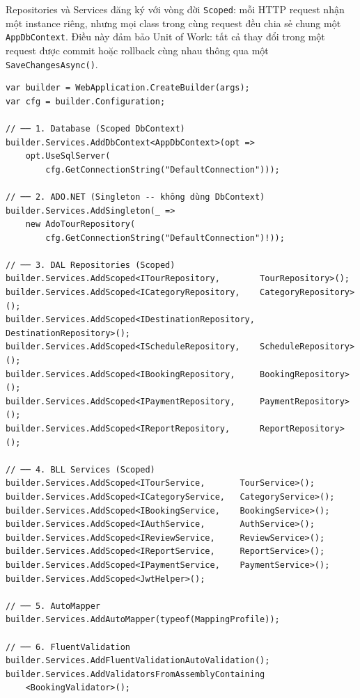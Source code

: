 \begin{lem}\label{lem3.1}
Repositories và Services đăng ký với vòng đời
\texttt{Scoped}: mỗi HTTP request nhận một instance riêng,
nhưng mọi class trong cùng request đều chia sẻ chung một
\texttt{AppDbContext}. Điều này đảm bảo Unit of Work:
tất cả thay đổi trong một request được commit hoặc rollback
cùng nhau thông qua một \texttt{SaveChangesAsync()}.
\end{lem}

\begin{lstlisting}[style=csharp,
  caption={Program.cs -- đăng ký DI đầy đủ của hệ thống},
  label={lst:di}]
var builder = WebApplication.CreateBuilder(args);
var cfg = builder.Configuration;

// ── 1. Database (Scoped DbContext)
builder.Services.AddDbContext<AppDbContext>(opt =>
    opt.UseSqlServer(
        cfg.GetConnectionString("DefaultConnection")));

// ── 2. ADO.NET (Singleton -- không dùng DbContext)
builder.Services.AddSingleton(_ =>
    new AdoTourRepository(
        cfg.GetConnectionString("DefaultConnection")!));

// ── 3. DAL Repositories (Scoped)
builder.Services.AddScoped<ITourRepository,        TourRepository>();
builder.Services.AddScoped<ICategoryRepository,    CategoryRepository>();
builder.Services.AddScoped<IDestinationRepository, DestinationRepository>();
builder.Services.AddScoped<IScheduleRepository,    ScheduleRepository>();
builder.Services.AddScoped<IBookingRepository,     BookingRepository>();
builder.Services.AddScoped<IPaymentRepository,     PaymentRepository>();
builder.Services.AddScoped<IReportRepository,      ReportRepository>();

// ── 4. BLL Services (Scoped)
builder.Services.AddScoped<ITourService,       TourService>();
builder.Services.AddScoped<ICategoryService,   CategoryService>();
builder.Services.AddScoped<IBookingService,    BookingService>();
builder.Services.AddScoped<IAuthService,       AuthService>();
builder.Services.AddScoped<IReviewService,     ReviewService>();
builder.Services.AddScoped<IReportService,     ReportService>();
builder.Services.AddScoped<IPaymentService,    PaymentService>();
builder.Services.AddScoped<JwtHelper>();

// ── 5. AutoMapper
builder.Services.AddAutoMapper(typeof(MappingProfile));

// ── 6. FluentValidation
builder.Services.AddFluentValidationAutoValidation();
builder.Services.AddValidatorsFromAssemblyContaining
    <BookingValidator>();


\end{lstlisting}
